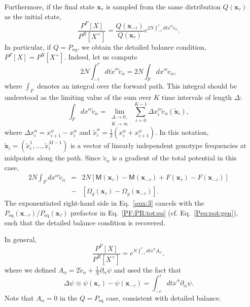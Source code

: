 \documentclass[9pt,twocolumn,twoside]{gsajnl}
\begin{document}
Furthermore, if the final state $\mathbf{x}_{\tau}$ is sampled from the same distribution $Q (\mathbf{x}_{\tau})$ as the initial state,
\begin{equation} \label{PF:PR:tot:eq}
\frac{P^F [X]}{P^R [X^+]} = \frac{Q (\mathbf{x}_{-\tau})}{Q (\mathbf{x}_{\tau})} e^{2 N  \int_{-\tau}^{\tau} dt \dot{x}^\alpha \widetilde{v}_\alpha}. %
\end{equation}
In particular, if $Q = P_\text{eq}$, we obtain the detailed balance condition, $P^F [X] = P^R [X^+]$. Indeed, let us compute
\begin{equation} \label{aux:1}
2 N \int_{-\tau}^{\tau} dt \dot{x}^\alpha \widetilde{v}_\alpha = 2 N \int_F d x^\alpha \widetilde{v}_\alpha,
\end{equation}
where $\int_F$ denotes an integral over the forward path. This integral should be understood as the limiting value of the sum over $K$ time intervals of length $\Delta$:
\begin{equation} \label{aux:2}
\int_F d x^\alpha \widetilde{v}_\alpha = \lim_{\substack{\Delta \to 0, \\ K \to \infty}} ~\sum_{i=0}^{K-1} \Delta x^\alpha_i \widetilde{v}_\alpha (\widetilde{\mathbf{x}}_i),
\end{equation}
where $\Delta x^\alpha_i = x^\alpha_{i+1} - x^\alpha_{i}$ and $\widetilde{x}^\alpha_i = \frac{1}{2} (x^\alpha_{i} + x^\alpha_{i+1})$. In this notation,
$\widetilde{\mathbf{x}}_i = (\widetilde{x}^{1}_{i}, \dots , \widetilde{x}^{M-1}_{i})$ is a vector of linearly independent genotype frequencies at midpoints along the path.
Since $\widetilde{v}_\alpha$ is a gradient of the total potential in this case,
\begin{eqnarray} \label{aux:3}
2 N \int_F d x^\alpha \widetilde{v}_\alpha &=& 2 N [\mathsf{M} (\mathbf{x}_{\tau}) - \mathsf{M} (\mathbf{x}_{-\tau}) + F(\mathbf{x}_{\tau}) - F(\mathbf{x}_{-\tau})] \nonumber \\
&-& [\Omega_g(\mathbf{x}_{\tau}) - \Omega_g(\mathbf{x}_{-\tau})].
\end{eqnarray}
The exponentiated right-hand side in Eq.~\eqref{aux:3} cancels with the ${P_\text{eq} (\mathbf{x}_{-\tau})} / {P_\text{eq} (\mathbf{x}_{\tau})}$ prefactor in Eq.~\eqref{PF:PR:tot:eq} (cf. Eq.~\eqref{Peq:pot:gen}),
such that the detailed balance condition is recovered.

In general,
\begin{equation} \label{PF:PR:tot:eq:gen}
\frac{P^F [X]}{P^R [X^+]} = e^{N  \int_{-\tau}^{\tau} dt \dot{x}^\alpha A_\alpha},
\end{equation}
where we defined $A_\alpha = 2 \widetilde{v}_\alpha + \frac{1}{N} \partial_\alpha \psi$ and used the fact that
\begin{equation} \label{delta:phi:eq}
\Delta \psi \equiv \psi (\mathbf{x}_{\tau}) - \psi (\mathbf{x}_{-\tau}) = \int_{-\tau}^{\tau} dt \dot{x}^\alpha \partial_\alpha \psi.
\end{equation}
Note that $A_\alpha = 0$ in the $Q = P_\text{eq}$ case, consistent with detailed balance.
\end{document}

